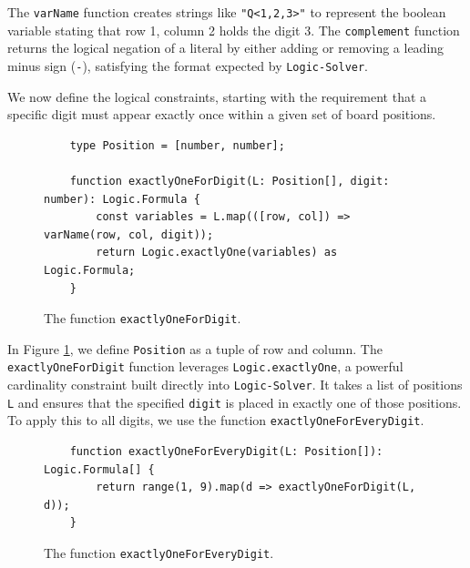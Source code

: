 The \texttt{varName} function creates strings like \texttt{"Q<1,2,3>"} to represent the boolean variable
stating that row 1, column 2 holds the digit 3. The \texttt{complement} function returns the logical negation
of a literal by either adding or removing a leading minus sign (\texttt{-}), satisfying the format expected by
\texttt{Logic-Solver}. 

We now define the logical constraints, starting with the requirement that a specific digit must appear exactly
once within a given set of board positions. 

\begin{figure}[!ht]
  \centering
\begin{verbatim}
    type Position = [number, number];
              
    function exactlyOneForDigit(L: Position[], digit: number): Logic.Formula {
        const variables = L.map(([row, col]) => varName(row, col, digit));
        return Logic.exactlyOne(variables) as Logic.Formula;
    }
\end{verbatim}
\vspace*{-0.3cm}
  \caption{The function \texttt{exactlyOneForDigit}.}
  \label{fig:logicsolver-exactlyOneForDigit}
\end{figure}

In Figure \ref{fig:logicsolver-exactlyOneForDigit}, we define \texttt{Position} as a tuple of row and
column. The \texttt{exactlyOneForDigit} function leverages \texttt{Logic.exactlyOne}, a powerful cardinality
constraint built directly into \texttt{Logic-Solver}. It takes a list of positions \texttt{L} and ensures that
the specified \texttt{digit} is placed in exactly one of those positions. 
To apply this to all digits, we use the function \texttt{exactlyOneForEveryDigit}.

\begin{figure}[!ht]
  \centering
\begin{verbatim}
    function exactlyOneForEveryDigit(L: Position[]): Logic.Formula[] {
        return range(1, 9).map(d => exactlyOneForDigit(L, d));
    }
\end{verbatim}
\vspace*{-0.3cm}
  \caption{The function \texttt{exactlyOneForEveryDigit}.}
  \label{fig:logicsolver-exactlyOneForEveryDigit}
\end{figure}

